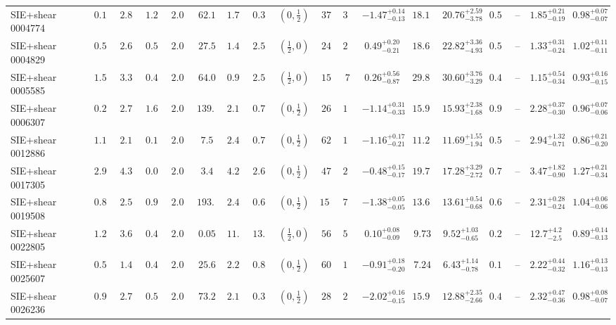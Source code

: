 \begin{longtable}{@{}lccccccccccccccccc@{}}
SIE+shear 0004774 & $0.19$ & $2.81$ & $1.20$ & $2.00$ & $62.1$ & $1.76$ & $0.38$ & $(0,\frac12)$ & $37$ & $32$ & $-1.47^{+0.14}_{-0.13}$ & $18.11$ & $20.76^{+2.59}_{-3.78}$ & $0.55$ & -- & $1.85^{+0.21}_{-0.19}$ & $0.98^{+0.07}_{-0.07}$\\
SIE+shear 0004829 & $0.57$ & $2.66$ & $0.55$ & $2.00$ & $27.5$ & $1.45$ & $2.54$ & $(\frac12,0)$ & $24$ & $22$ & $0.49^{+0.20}_{-0.21}$ & $18.65$ & $22.82^{+3.36}_{-4.93}$ & $0.53$ & -- & $1.33^{+0.31}_{-0.24}$ & $1.02^{+0.11}_{-0.11}$\\
SIE+shear 0005585 & $1.57$ & $3.35$ & $0.42$ & $2.00$ & $64.0$ & $0.99$ & $2.55$ & $(\frac12,0)$ & $15$ & $7$ & $0.26^{+0.56}_{-0.87}$ & $29.88$ & $30.60^{+3.76}_{-3.29}$ & $0.49$ & -- & $1.15^{+0.54}_{-0.34}$ & $0.93^{+0.16}_{-0.15}$\\
SIE+shear 0006307 & $0.28$ & $2.76$ & $1.66$ & $2.00$ & $139.4$ & $2.19$ & $0.78$ & $(0,\frac12)$ & $26$ & $16$ & $-1.14^{+0.31}_{-0.33}$ & $15.94$ & $15.93^{+2.38}_{-1.68}$ & $0.99$ & -- & $2.28^{+0.37}_{-0.30}$ & $0.96^{+0.07}_{-0.06}$\\
SIE+shear 0012886 & $1.14$ & $2.16$ & $0.17$ & $2.00$ & $7.5$ & $2.42$ & $0.73$ & $(0,\frac12)$ & $62$ & $19$ & $-1.16^{+0.17}_{-0.21}$ & $11.26$ & $11.69^{+1.55}_{-1.94}$ & $0.52$ & -- & $2.94^{+1.32}_{-0.71}$ & $0.86^{+0.21}_{-0.20}$\\
SIE+shear 0017305 & $2.97$ & $4.36$ & $0.07$ & $2.00$ & $3.4$ & $4.25$ & $2.63$ & $(0,\frac12)$ & $47$ & $24$ & $-0.48^{+0.15}_{-0.17}$ & $19.70$ & $17.28^{+3.29}_{-2.72}$ & $0.71$ & -- & $3.47^{+1.82}_{-0.90}$ & $1.27^{+0.21}_{-0.34}$\\
SIE+shear 0019508 & $0.83$ & $2.55$ & $0.97$ & $2.00$ & $193.4$ & $2.46$ & $0.62$ & $(0,\frac12)$ & $154$ & $79$ & $-1.38^{+0.05}_{-0.05}$ & $13.65$ & $13.61^{+0.54}_{-0.68}$ & $0.63$ & -- & $2.31^{+0.28}_{-0.24}$ & $1.04^{+0.06}_{-0.06}$\\
SIE+shear 0022805 & $1.26$ & $3.63$ & $0.45$ & $2.00$ & $0.05$ & $11.3$ & $13.0$ & $(\frac12,0)$ & $56$ & $52$ & $0.10^{+0.08}_{-0.09}$ & $9.73$ & $9.52^{+1.03}_{-0.65}$ & $0.24$ & -- & $12.7^{+4.2}_{-2.5}$ & $0.89^{+0.14}_{-0.13}$\\
SIE+shear 0025607 & $0.59$ & $1.46$ & $0.42$ & $2.00$ & $25.6$ & $2.22$ & $0.88$ & $(0,\frac12)$ & $60$ & $17$ & $-0.91^{+0.18}_{-0.20}$ & $7.24$ & $6.43^{+1.14}_{-0.78}$ & $0.16$ & -- & $2.22^{+0.44}_{-0.32}$ & $1.16^{+0.13}_{-0.13}$\\
SIE+shear 0026236 & $0.93$ & $2.72$ & $0.50$ & $2.00$ & $73.2$ & $2.10$ & $0.30$ & $(0,\frac12)$ & $28$ & $28$ & $-2.02^{+0.16}_{-0.15}$ & $15.94$ & $12.88^{+2.35}_{-2.66}$ & $0.49$ & -- & $2.32^{+0.47}_{-0.36}$ & $0.98^{+0.08}_{-0.07}$\\

\end{longtable}
